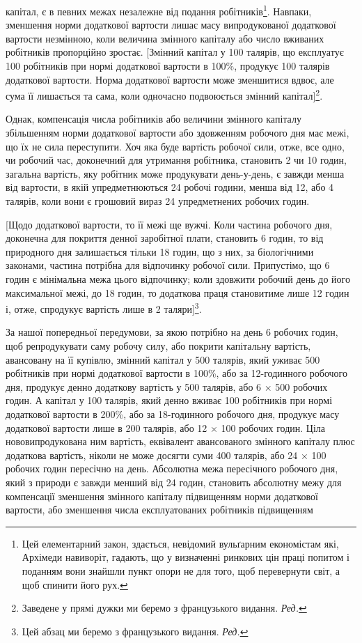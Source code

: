 \parcont{}  %
капітал, є в певних межах незалежне від подання робітників\footnote{
Цей елементарний закон, здається, невідомий вульґарним економістам
які, Архімеди навиворіт, гадають, що у визначенні ринкових цін
праці попитом і поданням вони знайшли пункт опори не для того, щоб
перевернути світ, а щоб спинити його рух.
}.
Навпаки, зменшення норми додаткової вартости лишає масу
випродукованої додаткової вартости незмінною, коли величина
змінного капіталу або число вживаних робітників пропорційно
зростає. [Змінний капітал у 100 талярів, що експлуатує 100 робітників
при нормі додаткової вартости в 100\%, продукує 100 талярів
додаткової вартости. Норма додаткової вартости може зменшитися
вдвоє, але сума її лишається та сама, коли одночасно
подвоюється змінний капітал]\footnote*{
Заведене у прямі дужки ми беремо з французького видання. \emph{Ред.}
}.

Однак, компенсація числа робітників або величини змінного
капіталу збільшенням норми додаткової вартости або здовженням
робочого дня має межі, що їх не сила переступити. Хоч яка
буде вартість робочої сили, отже, все одно, чи робочий час,
доконечний для утримання робітника, становить 2 чи 10 годин,
загальна вартість, яку робітник може продукувати день-у-день,
є завжди менша від вартости, в якій упредметнюються 24 робочі
години, менша від 12, або 4 талярів, коли вони є грошовий
вираз 24 упредметнених робочих годин.

[Щодо додаткової вартости, то її межі ще вужчі. Коли частина
робочого дня, доконечна для покриття денної заробітної плати,
становить 6 годин, то від природного дня залишається тільки 18 годин,
що з них, за біологічними законами, частина потрібна для
відпочинку робочої сили. Припустімо, що 6 годин є мінімальна
межа цього відпочинку; коли здовжити робочий день до його максимальної
межі, до 18 годин, то додаткова праця становитиме
лише 12 годин і, отже, спродукує вартість лише в 2 таляри]\footnote*{
Цей абзац ми беремо з французького видання. \emph{Ред.}
}.

\disablefootnotebreak{}
За нашої попередньої передумови, за якою потрібно на день
6 робочих годин, щоб репродукувати саму робочу силу, або
покрити капітальну вартість, авансовану на її купівлю, змінний
капітал у 500 талярів, який уживає 500 робітників при нормі
додаткової вартости в 100\%, або за 12-годинного робочого дня,
продукує денно додаткову вартість у 500 талярів, або 6 × 500
робочих годин. А капітал у 100 талярів, який денно вживає
100 робітників при нормі додаткової вартости в 200\%, або за 18-годинного
робочого дня, продукує масу додаткової вартости лише
в 200 талярів, або 12 × 100 робочих годин. Ціла нововипродукована
ним вартість, еквівалент авансованого змінного капіталу
плюс додаткова вартість, ніколи не може досягти суми 400 талярів,
або 24 × 100 робочих годин пересічно на день. Абсолютна
межа пересічного робочого дня, який з природи є завжди менший
від 24 годин, становить абсолютну межу для компенсації зменшення
змінного капіталу підвищенням норми додаткової вартости,
або зменшення числа експлуатованих робітників підвищенням
\parbreak{}  %

